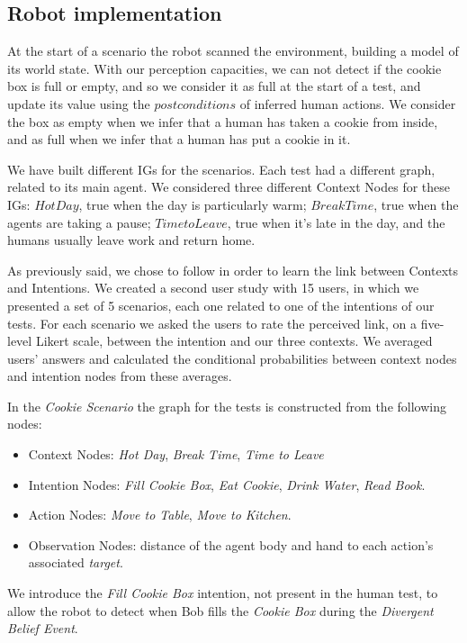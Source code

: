 \subsection{Robot implementation}
At the start of a scenario the robot scanned the environment, building a model of its world state. With our perception capacities, we can not detect if the cookie box is full or empty, and so we consider it as full at the start of a test, and update its value using the $postconditions$ of inferred human actions. We consider the box as empty when we infer that a human has taken a cookie from inside, and as full when we infer that a human has put a cookie in it.

We have built different IGs for the scenarios. Each test had a different graph, related to its main agent. We considered three different Context Nodes for these IGs: $Hot Day$, true when the day is particularly warm; $Break Time$, true when the agents are taking a pause; $Time to Leave$, true when it's late in the day, and the humans usually leave work and return home.

As previously said, we chose to follow \cite{Liu2014} in order to learn the link between Contexts and Intentions. We created a second user study with 15 users, in which we presented a set of 5 scenarios, each one related to one of the intentions of our tests. For each scenario we asked the users to rate the perceived link, on a five-level Likert scale, between the intention and our three contexts. We averaged users' answers and calculated the conditional probabilities between context nodes and intention nodes from these averages.


In the \textit{Cookie Scenario} the graph for the tests is constructed from the following nodes:
\begin{itemize}
\item Context Nodes: \textit{Hot Day}, \textit{Break Time}, \textit{Time to Leave}
\item Intention Nodes: \textit{Fill Cookie Box}, \textit{Eat Cookie}, \textit{Drink Water}, \textit{Read Book}.
\item Action Nodes: \textit{Move to Table}, \textit{Move to Kitchen}.
\item Observation Nodes: distance of the agent body and hand to each action's associated \textit{target}.
\end{itemize}

We introduce the \textit{Fill Cookie Box} intention, not present in the human test, to allow the robot to detect when Bob fills the \textit{Cookie Box} during the \textit{Divergent Belief Event}.

